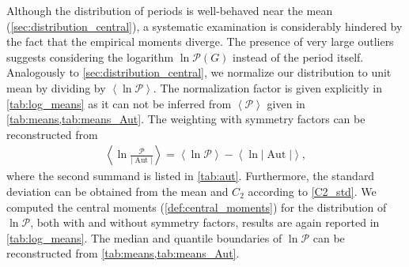 \documentclass[11pt,a4paper]{article}
\newcommand{\abs}[1]{\lvert #1 \rvert}
\newcommand{\period}{\mathcal P}
\newcommand{\Aut}{\operatorname{Aut}}
\renewcommand{\|}{\rule[-0.4ex]{0.2ex}{1.2em}}
\begin{document}
Although the distribution of periods is well-behaved near the mean (\cref{sec:distribution_central}), a systematic examination is considerably hindered by the fact that the empirical moments diverge. The presence of very large outliers suggests considering the logarithm $\ln \period(G)$ instead of the period itself. Analogously to \cref{sec:distribution_central}, we normalize our distribution to unit mean by dividing by $\left \langle \ln \period \right \rangle $. The normalization factor is given explicitly in \cref{tab:log_means} as it can not be inferred   from $\left \langle \period \right \rangle $ given in \cref{tab:means,tab:means_Aut}. The weighting with symmetry factors can be reconstructed from  
\begin{align*}
	\left \langle \ln \frac{\period }{\abs{\Aut }} \right \rangle = \left \langle  \ln \period  \right \rangle -\left \langle \ln \abs{\Aut } \right \rangle ,
\end{align*}
where the second summand is listed in \cref{tab:aut}.  Furthermore, the standard deviation can be obtained from the mean and $C_2$ according to \cref{C2_std}. 
We computed the central moments (\cref{def:central_moments}) for the distribution of $\ln \period$, both with and without symmetry factors, results are again reported in \cref{tab:log_means}. The median and quantile boundaries of $\ln \period$ can be reconstructed from \cref{tab:means,tab:means_Aut}.
\end{document}
